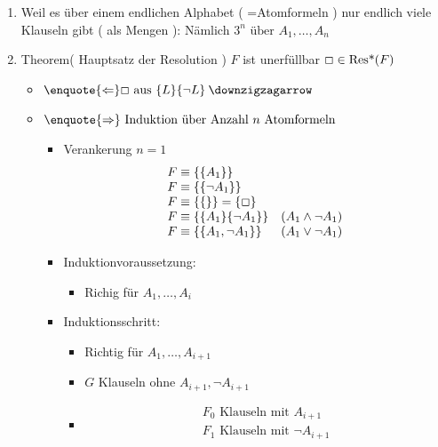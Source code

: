 \begin{enumerate}
	\item Weil es über einem endlichen Alphabet ( =Atomformeln ) nur endlich viele Klauseln gibt ( als Mengen  ): Nämlich $3^n \text{ über } A_1 , \dotsc , A_n$
	\item Theorem( Hauptsatz der Resolution ) $F$ ist unerfüllbar \gdw $\Box \in \operatorname{Res*}( F )$
	\begin{itemize}
		\item
			\begin{bew}
				$\enquote{\Leftarrow} \Box \text{ aus } \{ L \} \{ \neg L \} \: \text{\lightning}$
			\end{bew}
		\item
			\begin{bew}
				$\enquote{\Rightarrow} \text{ Induktion über Anzahl } n \text{ Atomformeln}$
				\begin{itemize}
					\item Verankerung $n=1$ \\
					\begin{gather*}
						\begin{array}{ l l }
							F \equiv \{ \{ A_1 \} \}									\\
							F \equiv \{ \{ \neg A_1 \} \}								\\
							F \equiv \{ \{ \} \}  = \{ \Box \}							\\
							F \equiv \{ \{ A_1 \} \{ \neg A_1 \} \}	& (A_1 \wedge \neg A_1 )	\\
							F \equiv \{ \{ A_1 , \neg A_1 \} \}		& ( A_1 \vee \neg A_1 )	
						\end{array}
					\end{gather*}
					\item Induktionvoraussetzung:
					\begin{itemize}
						\item Richig für $A_1 , \dotsc , A_i$
					\end{itemize}
					\item Induktionsschritt:
					\begin{itemize}
						\item Richtig für $A_1 , \dotsc , A_{i+1}$
						\item $G$ Klauseln ohne $A_{i+1} , \neg A_{i+1}$
						\item
							\begin{gather*}
								F_0 \text{ Klauseln mit } A_{i+1} \\
								F_1 \text{ Klauseln mit } \neg A_{i+1} \\

\end{gather*}
\end{itemize}
\end{itemize}
\end{bew}
\end{itemize}
\end{enumerate}
